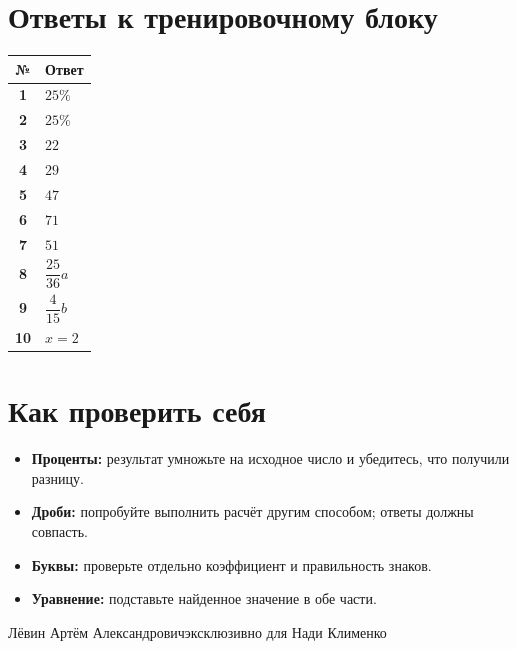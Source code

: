 \documentclass[a4paper,12pt]{article}
\newcommand{\sect}[1]{\Needspace{8\baselineskip}\section*{\color{darkaccent}#1}\vspace{-2mm}\noindent{\color{softline}\rule{\linewidth}{0.5pt}}\vspace{1mm}}
\begin{document}
\sect{Ответы к тренировочному блоку}
\renewcommand{\arraystretch}{1.6}
\begin{center}
\begin{tabularx}{0.82\linewidth}{@{}>{\bfseries}c X@{}}
\toprule
№ & Ответ \\
\midrule
1 & \(25\%\) \\
2 & \(25\%\) \\
3 & \(22\) \\
4 & \(29\) \\
5 & \(47\) \\
6 & \(71\) \\
7 & \(51\) \\
8 & \(\dfrac{25}{36}a\) \\
9 & \(\dfrac4{15}b\) \\
10 & \(x=2\) \\
\bottomrule
\end{tabularx}
\end{center}
\vspace{10mm}
\sect{Как проверить себя}
\begin{itemize}
\item \textbf{Проценты:} результат умножьте на исходное число и убедитесь, что получили разницу.
\item \textbf{Дроби:} попробуйте выполнить расчёт другим способом; ответы должны совпасть.
\item \textbf{Буквы:} проверьте отдельно коэффициент и правильность знаков.
\item \textbf{Уравнение:} подставьте найденное значение в обе части.
\end{itemize}
\vfill
\begin{center}
{\color{textgray}\footnotesize Лёвин Артём Александрович\quad\textbullet\quad эксклюзивно для Нади Клименко}
\end{center}
\end{document}
